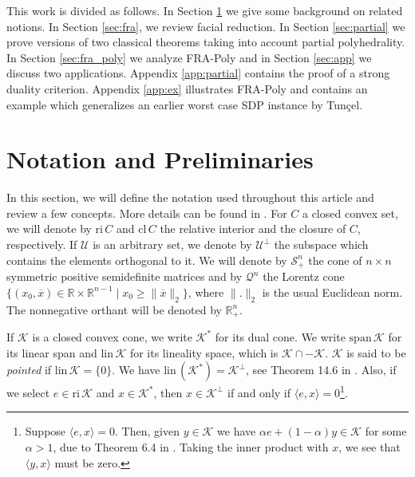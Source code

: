 \documentclass{article}
\newcommand{\SOC}[1]{{\mathcal{Q}^{#1}}}
\newcommand{\reInt}{\mathrm{ri}\,}
\newcommand{\lineality}{\mathrm{lin}\,}
\newcommand{\closure}{\mathrm{cl}\,}
\newcommand{\spanVec}{\mathrm{span}\,}
\newcommand{\norm}[1]{\lVert{#1}\rVert}
\newcommand{\inProd}[2]{\langle #1 , #2 \rangle }
\newcommand{\feasD}{\mathcal{F}_{\text{D }}}
\newcommand{\PSDcone}[1]{{\mathcal{S}^{#1}_+}}
\newcommand{\minFaceD}{ {\mathcal{F}_{\min}^D}}
\newcommand{\stdCone}{ {\mathcal{K}}}
\newcommand{\stdInt}{ {e}}
\renewcommand{\Re}{\mathbb{R}}
\newtheorem*{remark}{Remark}
\begin{document}
 
This work is divided as follows. In Section \ref{sec:not} we give some background on 
 related notions. In 
 Section \ref{sec:fra}, we review facial reduction.  In Section \ref{sec:partial} we prove 
 versions of two classical theorems taking into account partial polyhedrality.
 In Section \ref{sec:fra_poly} we analyze FRA-Poly and in Section \ref{sec:app} we 
 discuss two applications. Appendix \ref{app:partial} contains the proof of a strong duality 
 criterion. Appendix \ref{app:ex} illustrates FRA-Poly and contains an example which generalizes 
 an earlier worst case SDP instance by Tun\c{c}el.
 

\section{Notation and Preliminaries}\label{sec:not}
In this section, we will define the notation used throughout this article and 
review a few concepts. More details  can be found in \cite{rockafellar,pataki_handbook}.
For $C$ a closed convex set, we will denote by $\reInt C$ and 
$\closure C$ the relative interior and the closure of $C$, respectively.
If $\mathcal{U}$ is an 
arbitrary set, we denote by $\mathcal{U}^\perp$ the subspace which contains 
the elements orthogonal to it. We will denote by $\PSDcone{n}$ the cone of 
$n\times n$ symmetric positive semidefinite matrices and by $\SOC{n}$ the 
Lorentz cone $\{(x_0,\overline{x}) \in \Re\times \Re^{n-1} \mid x_0 \geq \norm{\overline{x}}_2 \}$, 
where $\norm{.}_2$ is the usual Euclidean norm.
The nonnegative orthant will be denoted by $\Re^n_+$. 



If $\stdCone$ is a closed convex cone, we write $\stdCone^*$ for its dual 
cone. We write $\spanVec \stdCone$ for its linear span and $\lineality \stdCone$ for 
its lineality space, which is $\stdCone \cap -\stdCone$. $\stdCone$ is said to be \emph{pointed} if 
$\lineality \stdCone  = \{0\}$. We have $\lineality (\stdCone^*) = \stdCone^\perp$, see Theorem 14.6 in \cite{rockafellar}. Also, if we select $\stdInt \in \reInt \stdCone$ and $x \in \stdCone^*$, then $x \in \stdCone^\perp $ if and only if $\inProd{\stdInt}{x} = 0$\footnote{Suppose $\inProd{\stdInt}{x} = 0$. Then, given $y \in \stdCone$ we have $\alpha \stdInt +(1-\alpha)y \in \stdCone$ for some $\alpha > 1$, due to Theorem 6.4 in \cite{rockafellar}. Taking the inner product with $x$, we see that $\inProd{y}{x}$ must be zero.}.
\end{document}
